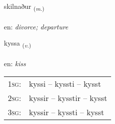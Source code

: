 \documentclass[frontgrid, backgrid]{flacards}\usepackage[]{graphicx}\usepackage[]{xcolor}
\begin{document}
\renewcommand{\flhead}{\vskip5pt \fboxsep=0pt {\small\bfseries\footnotesize Nafnorð | Noun}}
\renewcommand{\fcfoot}{\vskip5pt \fboxsep=0pt \hspace{2pt}{\small\bfseries\footnotesize 3K}}

\renewcommand{\blhead}{\vskip5pt {\small\bfseries\footnotesize Nafnorð | Noun }}
\renewcommand{\bcfoot}{\vskip5pt \hspace{2pt}{\small\bfseries\footnotesize 3K}}


{skilnaður \small{\textsubscript{(\textit{m.})}} \\[1ex] %
\textphonetic{[scɪlnaðʏr]} \\
en: \emph{divorce; departure} \\  [2ex]
\renewcommand*{\arraystretch}{0.8}
}

\renewcommand{\flhead}{\vskip5pt \fboxsep=0pt {\small\bfseries\footnotesize Sagnorð | Verb}}
\renewcommand{\fcfoot}{\vskip5pt \fboxsep=0pt \hspace{2pt}{\small\bfseries\footnotesize 3K}}

\renewcommand{\blhead}{\vskip5pt {\small\bfseries\footnotesize Sagnorð | Verb }}
\renewcommand{\bcfoot}{\vskip5pt \hspace{2pt}{\small\bfseries\footnotesize 3K}}


{kyssa \small{\textsubscript{(\textit{v.})}} \\[1ex] %
\textphonetic{[cʰɪsa]} \\
en: \emph{kiss} \\  [2ex]
\renewcommand*{\arraystretch}{0.8}
\begin{tabular}{p{1cm}l}
\textsc{1sg}: & kyssi -- kyssti -- kysst \\ 
\textsc{2sg}: & kyssir -- kysstir -- kysst \\ 
\textsc{3sg}: & kyssir -- kyssti -- kysst \\ 
\end{tabular}
}
\end{document}

